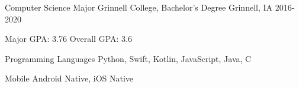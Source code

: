 \documentclass[11pt, a4paper]{awesome-cv}
\begin{document}
\begin{cventries}


\end{cventries}


\begin{cventries}
  \cventry
    {Computer Science Major}
    {Grinnell College, Bachelor's Degree}
    {Grinnell, IA}
    {2016-2020}
    {
      \begin{cvitems}
        \item {Major GPA: 3.76 \quad Overall GPA: 3.6}
      \end{cvitems}
    }
\end{cventries}


\begin{cvskills}
  \cvskill
    {Programming Languages} 
    {Python, Swift, Kotlin, JavaScript, Java, C} 


  \cvskill
    {Mobile}
    {Android Native, iOS Native}

\end{cvskills}


%
%
\end{document}
